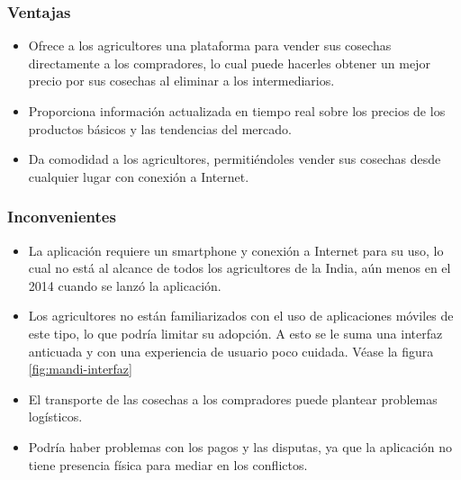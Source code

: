\subsubsection{Ventajas}

\begin{itemize}

	\item Ofrece a los agricultores una plataforma para vender sus cosechas directamente a los compradores, lo cual puede hacerles obtener un mejor precio por sus cosechas al eliminar a los intermediarios.

	\item Proporciona información actualizada en tiempo real sobre los precios de los productos básicos y las tendencias del mercado.

	\item  Da comodidad a los agricultores, permitiéndoles vender sus cosechas desde cualquier lugar con conexión a Internet.

\end{itemize}

\subsubsection{Inconvenientes}

\begin{itemize}

	\item La aplicación requiere un smartphone y conexión a Internet para su uso, lo cual no está al alcance de todos los agricultores de la India, aún menos en el 2014 cuando se lanzó la aplicación.

	\item Los agricultores no están familiarizados con el uso de aplicaciones móviles de este tipo, lo que podría limitar su adopción. A esto se le suma una interfaz anticuada y con una experiencia de usuario poco cuidada. Véase la figura \ref{fig:mandi-interfaz}

	\item El transporte de las cosechas a los compradores puede plantear problemas logísticos.

	\item Podría haber problemas con los pagos y las disputas, ya que la aplicación no tiene presencia física para mediar en los conflictos.

\end{itemize}


